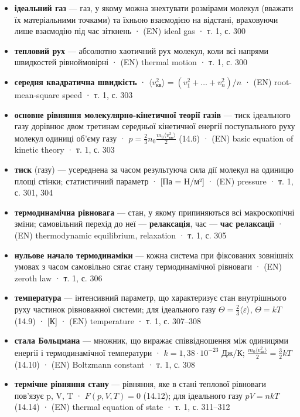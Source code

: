 \documentclass[11pt,a4paper,oneside]{book}
\newcommand{\book}{}
\begin{document}
\begin{itemize}
\item \textbf{ідеальний газ} — газ, у якому можна знехтувати розмірами молекул (вважати їх матеріальними точками) та їхньою взаємодією на відстані, враховуючи лише взаємодію під час зіткнень · (EN) ideal gas · \book{} т. 1, с. 300
\item \textbf{тепловий рух} — абсолютно хаотичний рух молекул, коли всі напрями швидкостей рівноймовірні · (EN) thermal motion · \book{} т. 1, с. 300
\item \textbf{середня квадратична швидкість} · $\langle v_{\text{кв}}^2\rangle = (v_1^2+\ldots+v_n^2)/n$ · (EN) root-mean-square speed · \book{} т. 1, с. 303
\item \textbf{основне рівняння молекулярно-кінетичної теорії газів} — тиск ідеального газу дорівнює двом третинам середньої кінетичної енергії поступального руху молекул одиниці об'єму газу · $p = \tfrac23 n_0 \tfrac{m_0\langle v_{\text{кв}}^2\rangle}{2}$ (14.6) · (EN) basic equation of kinetic theory · \book{} т. 1, с. 303
\item \textbf{тиск} (газу) — усереднена за часом результуюча сила дії молекул на одиницю площі стінки; статистичний параметр · [Па = Н/м²] · (EN) pressure · \book{} т. 1, с. 301, 304
\item \textbf{термодинамічна рівновага} — стан, у якому припиняються всі макроскопічні зміни; самовільний перехід до неї — \textbf{релаксація}, час — \textbf{час релаксації} · (EN) thermodynamic equilibrium, relaxation · \book{} т. 1, с. 305
\item \textbf{нульове начало термодинаміки} — кожна система при фіксованих зовнішніх умовах з часом самовільно сягає стану термодинамічної рівноваги · (EN) zeroth law · \book{} т. 1, с. 306
\item \textbf{температура} — інтенсивний параметр, що характеризує стан внутрішнього руху частинок рівноважної системи; для ідеального газу $\Theta = \tfrac23\langle\varepsilon\rangle$, $\Theta = kT$ (14.9) · [К] · (EN) temperature · \book{} т. 1, с. 307–308
\item \textbf{стала Больцмана} — множник, що виражає співвідношення між одиницями енергії і термодинамічної температури · $k = 1{,}38\cdot10^{-23}$ Дж/К; $\tfrac{m_0\langle v_{\text{кв}}^2\rangle}{2} = \tfrac32kT$ (14.10) · (EN) Boltzmann constant · \book{} т. 1, с. 308
\item \textbf{термічне рівняння стану} — рівняння, яке в стані теплової рівноваги пов'язує p, V, T · $F(p,V,T)=0$ (14.12); для ідеального газу $pV = nkT$ (14.14) · (EN) thermal equation of state · \book{} т. 1, с. 311–312

\end{itemize}
\end{document}
